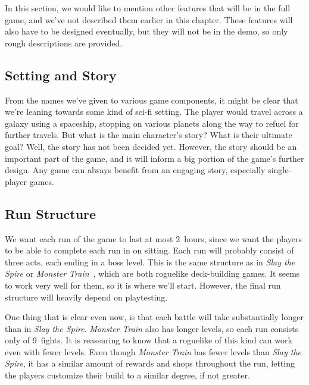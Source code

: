 In this section, we would like to mention other features that will be in the full game, and we've not described them earlier in this chapter.
These features will also have to be designed eventually, but they will not be in the demo, so only rough descriptions are provided.

\begin{notindemo}

    \subsection{Setting and Story}

    From the names we've given to various game components, it might be clear that we're leaning towards some kind of sci-fi setting.
    The player would travel across a galaxy using a spaceship, stopping on various planets along the way to refuel for further travels.
    But what is the main character's story?
    What is their ultimate goal?
    Well, the story has not been decided yet.
    However, the story should be an important part of the game, and it will inform a big portion of the game's further design.
    Any game can always benefit from an engaging story, especially single-player games.

    \subsection{Run Structure}

    We want each run of the game to last at most 2~hours, since we want the players to be able to complete each run in on sitting.
    Each run will probably consist of three acts, each ending in a boss level.
    This is the same structure as in \emph{Slay the Spire} or \emph{Monster Train}~\cite{MonsterTrain}, which are both roguelike deck-building games.
    It seems to work very well for them, so it is where we'll start.
    However, the final run structure will heavily depend on playtesting.

    One thing that is clear even now, is that each battle will take substantially longer than in \emph{Slay the Spire}.
    \emph{Monster Train} also has longer levels, so each run consists only of 9~fights.
    It is reassuring to know that a roguelike of this kind can work even with fewer levels.
    Even though \emph{Monster Train} has fewer levels than \emph{Slay the Spire}, it has a similar amount of rewards and shops throughout the run, letting the players customize their build to a similar degree, if not greater.


\end{notindemo}
